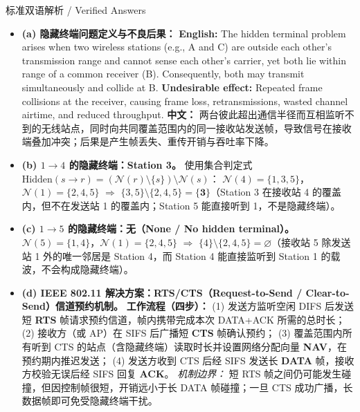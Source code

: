 
\begin{StudySolution}{标准双语解析 / Verified Answers}
\begin{itemize}
\item \textbf{(a) 隐藏终端问题定义与不良后果：}
  \textbf{English:} The hidden terminal problem arises when two wireless stations (e.g., A and C) are outside each other's transmission range and cannot sense each other's carrier, yet both lie within range of a common receiver (B). Consequently, both may transmit simultaneously and collide at B. \textbf{Undesirable effect:} Repeated frame collisions at the receiver, causing frame loss, retransmissions, wasted channel airtime, and reduced throughput.
  \textbf{中文：} 两台彼此超出通信半径而互相监听不到的无线站点，同时向共同覆盖范围内的同一接收站发送帧，导致信号在接收端叠加冲突；后果是产生帧丢失、重传开销与吞吐率下降。
\item \textbf{(b) $1 \to 4$ 的隐藏终端：Station 3。}
  使用集合判定式 $\mathrm{Hidden}(s\to r) = (\mathcal{N}(r)\setminus\{s\})\setminus\mathcal{N}(s)$：
  $\mathcal{N}(4)=\{1,3,5\}$，$\mathcal{N}(1)=\{2,4,5\}$ $\Rightarrow$ $\{3,5\}\setminus\{2,4,5\} = \mathbf{\{3\}}$（Station 3 在接收站 4 的覆盖内，但不在发送站 1 的覆盖内；Station 5 能直接听到 1，不是隐藏终端）。
\item \textbf{(c) $1 \to 5$ 的隐藏终端：无（None / No hidden terminal）。}
  $\mathcal{N}(5)=\{1,4\}$，$\mathcal{N}(1)=\{2,4,5\}$ $\Rightarrow$ $\{4\}\setminus\{2,4,5\} = \mathbf{\varnothing}$（接收站 5 除发送站 1 外的唯一邻居是 Station 4，而 Station 4 能直接监听到 Station 1 的载波，不会构成隐藏终端）。
\item \textbf{(d) IEEE 802.11 解决方案：\textbf{RTS/CTS（Request-to-Send / Clear-to-Send）信道预约机制}。}
  \textbf{工作流程（四步）：}
  (1) 发送方监听空闲 DIFS 后发送短 \textbf{RTS} 帧请求预约信道，帧内携带完成本次 DATA+ACK 所需的总时长；
  (2) 接收方（或 AP）在 SIFS 后广播短 \textbf{CTS} 帧确认预约；
  (3) 覆盖范围内所有听到 CTS 的站点（含隐藏终端）读取时长并设置网络分配向量 \textbf{NAV}，在预约期内推迟发送；
  (4) 发送方收到 CTS 后经 SIFS 发送长 \textbf{DATA} 帧，接收方校验无误后经 SIFS 回复 \textbf{ACK}。
  \emph{机制边界：} 短 RTS 帧之间仍可能发生碰撞，但因控制帧很短，开销远小于长 DATA 帧碰撞；一旦 CTS 成功广播，长数据帧即可免受隐藏终端干扰。
\end{itemize}
\end{StudySolution}


